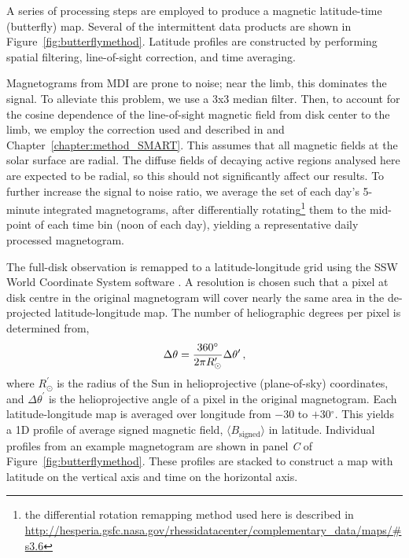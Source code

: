 A series of processing steps are employed to produce a magnetic latitude-time (butterfly) map. Several of the intermittent data products are shown in Figure~\ref{fig:butterflymethod}. Latitude profiles are constructed by performing spatial filtering, line-of-sight correction, and time averaging. 

Magnetograms from MDI are prone to noise; near the limb, this dominates the signal. To alleviate this problem, we use a 3x3 median filter. Then, to account for the cosine dependence of the line-of-sight magnetic field from disk center to the limb, we employ the correction used and described in \cite{higgins:2011} and Chapter~\ref{chapter:method_SMART}. This assumes that all magnetic fields at the solar surface are radial. The diffuse fields of decaying active regions analysed here are expected to be radial, so this should not significantly affect our results. To further increase the signal to noise ratio, we average the set of each day's 5-minute integrated magnetograms, after differentially rotating\footnote{the differential rotation remapping method used here is described in \url{http://hesperia.gsfc.nasa.gov/rhessidatacenter/complementary_data/maps/\#s3.6}} them to the mid-point of each time bin (noon of each day), yielding a representative daily processed magnetogram. 

The full-disk observation is remapped to a latitude-longitude grid using the SSW World Coordinate System software \citep{Thompson:2006}. A resolution is chosen such that a pixel at disk centre in the original magnetogram will cover nearly the same area in the de-projected latitude-longitude map. The number of heliographic degrees per pixel is determined from,
\begin{equation}
\Delta \theta =\frac{360^\circ}{2\pi R^{\prime}_\odot} \Delta \theta^{\prime} \mbox{\,,}
\end{equation}
where $R^\prime_\odot$ is the radius of the Sun in helioprojective (plane-of-sky) coordinates, and $\Delta \theta^\prime$ is the helioprojective angle of a pixel in the original magnetogram. Each latitude-longitude map is averaged over longitude from $-$30 to $+$30$^{\circ}$. This yields a 1D profile of average signed magnetic field, $\langle B_{\mathrm{signed}} \rangle$ in latitude. 
Individual profiles from an example magnetogram are shown in panel \emph{C} of Figure~\ref{fig:butterflymethod}.
These profiles are stacked to construct a map with latitude on the vertical axis and time on the horizontal axis.%

